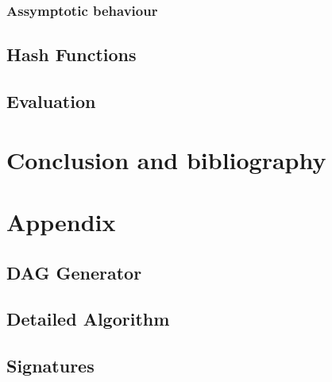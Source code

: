 \documentclass[a4paper,10pt]{report}
\theoremstyle{definition}
\theoremstyle{definition}
\begin{document}
\subsection{Assymptotic behaviour}

\section{Hash Functions}

\section{Evaluation}

\chapter{Conclusion and bibliography}
%   
\chapter{Appendix}
\section{DAG Generator}
\label{sec:daggen}

\section{Detailed Algorithm}
\label{sec:detailedalgo}

\section{Signatures}
\label{sec:datasig}

%   
\end{document}
